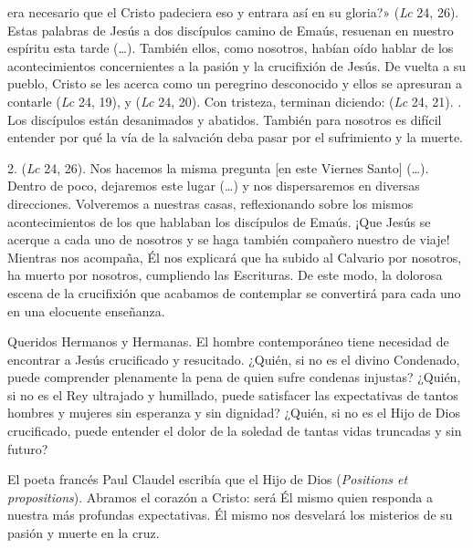\begin{body}
 era necesario que el Cristo padeciera eso y entrara así en su gloria?» (\textit{Lc} 24, 26). Estas palabras de Jesús a dos discípulos camino de Emaús, resuenan en nuestro espíritu esta tarde (\ldots). También ellos, como nosotros, habían oído hablar de los acontecimientos concernientes a la pasión y la crucifixión de Jesús. De vuelta a su pueblo, Cristo se les acerca como un peregrino desconocido y ellos se apresuran a contarle  (\textit{Lc} 24, 19), y  (\textit{Lc} 24, 20). Con tristeza, terminan diciendo:  (\textit{Lc} 24, 21). . Los discípulos están desanimados y abatidos. También para nosotros es difícil entender por qué la vía de la salvación deba pasar por el sufrimiento y la muerte.

2.  (\textit{Lc} 24, 26). Nos hacemos la misma pregunta [en este Viernes Santo] (\ldots). Dentro de poco, dejaremos este lugar (\ldots) y nos dispersaremos en diversas direcciones. Volveremos a nuestras casas, reflexionando sobre los mismos acontecimientos de los que hablaban los discípulos de Emaús. ¡Que Jesús se acerque a cada uno de nosotros y se haga también compañero nuestro de viaje! Mientras nos acompaña, Él nos explicará que ha subido al Calvario por nosotros, ha muerto por nosotros, cumpliendo las Escrituras. De este modo, la dolorosa escena de la crucifixión que acabamos de contemplar se convertirá para cada uno en una elocuente enseñanza.

Queridos Hermanos y Hermanas. El hombre contemporáneo tiene necesidad de encontrar a Jesús crucificado y resucitado. ¿Quién, si no es el divino Condenado, puede comprender plenamente la pena de quien sufre condenas injustas? ¿Quién, si no es el Rey ultrajado y humillado, puede satisfacer las expectativas de tantos hombres y mujeres sin esperanza y sin dignidad? ¿Quién, si no es el Hijo de Dios crucificado, puede entender el dolor de la soledad de tantas vidas truncadas y sin futuro?

El poeta francés Paul Claudel escribía que el Hijo de Dios  (\textit{Positions et propositions}). Abramos el corazón a Cristo: será Él mismo quien responda a nuestra más profundas expectativas. Él mismo nos desvelará los misterios de su pasión y muerte en la cruz.


\end{body}
